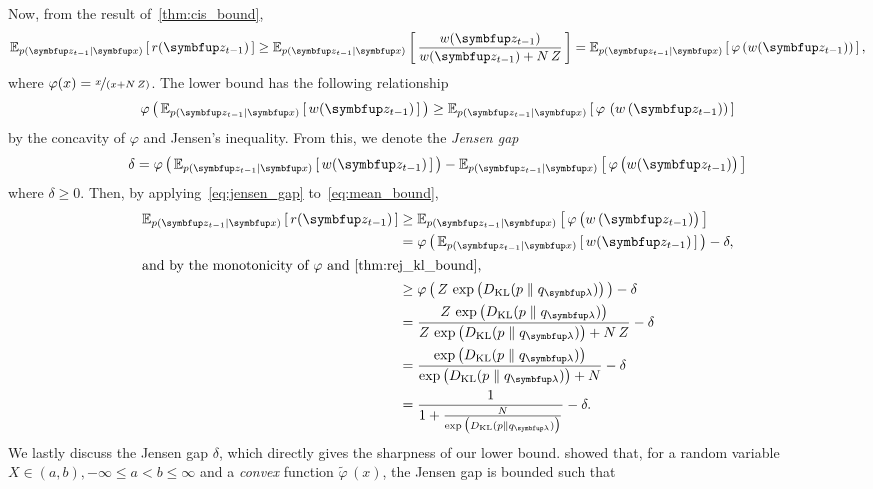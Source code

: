 \begin{proofEnd}
  Now, from the result of~\cref{thm:cis_bound},
  \begin{equation}
    \Esub{p(\vz_{t-1}\mid\vx)}{ r(\vz_{t-1}) } \geq \Esub{p(\vz_{t-1}\mid\vx)}{ \frac{w(\vz_{t-1})}{w(\vz_{t-1}) + N\,Z}} =
    \Esub{p(\vz_{t-1}\mid\vx)}{ \varphi\left( w(\vz_{t-1}) \right)  },\label{eq:mean_bound}
  \end{equation}
  where \(\varphi(x) = \nicefrac{x}{(x + N\,Z)}\).
  The lower bound has the following relationship
  \begin{equation}
    \varphi\left(\,
    \Esub{p(\vz_{t-1}\mid\vx)}{ w(\vz_{t-1}) }
    \,\right)
    \geq
    \Esub{p(\vz_{t-1}\mid\vx)}{ \varphi\,\left( w\,(\vz_{t-1}) \right)  }
  \end{equation}
  by the concavity of \(\varphi\) and Jensen's inequality.
  From this, we denote the \textit{Jensen gap}
  \begin{equation}
    \delta = 
    \varphi\left(\,
    \Esub{p(\vz_{t-1}\mid\vx)}{ w(\vz_{t-1}) }
    \,\right)
    -
    \Esub{p(\vz_{t-1}\mid\vx)}{ \varphi\,\big( w(\vz_{t-1}) \big)  }\label{eq:jensen_gap}
  \end{equation}
  where \(\delta \geq 0\).
  Then, by applying~\eqref{eq:jensen_gap} to~\eqref{eq:mean_bound},
  \begin{align}
    \Esub{p(\vz_{t-1}\mid\vx)}{ r(\vz_{t-1}) }
    &\geq \Esub{p(\vz_{t-1}\mid\vx)}{ \varphi\,\big( w\,(\vz_{t-1}) \big)  } \\
    &= \varphi\left(\,
    \Esub{p(\vz_{t-1}\mid\vx)}{ w(\vz_{t-1}) }
    \,\right) - \delta, \\
\intertext{and by the monotonicity of \(\varphi\) and~\cref{thm:rej_kl_bound},}
    &\geq \varphi\left(\,
    Z\,\exp\big(\DKL{p}{q_{\vlambda}}\big)
    \,\right) - \delta \\
    &=
    \frac{
      Z\,\exp\big(\DKL{p}{q_{\vlambda}}\big)
    }{
      Z\,\exp\big(\DKL{p}{q_{\vlambda}}\big) + N\,Z
    } - \delta \\
    &= \frac{
      \exp\big(\DKL{p}{q_{\vlambda}}\big)
    }{
      \exp\big(\DKL{p}{q_{\vlambda}}\big) + N
    } - \delta  \\
    &= \frac{1}{
       1 + \frac{N}{
         \exp\big(\DKL{p}{q_{\vlambda}}\big) 
      }
    } - \delta.
  \end{align}
  We lastly discuss the Jensen gap \(\delta\), which directly gives the sharpness of our lower bound.
  \citet[Theorem 1]{liao_sharpening_2019} showed that, for a random variable \(X \in (a, b), -\infty \leq a < b \leq \infty\) and a \textit{convex} function \(\widetilde{\varphi}\,(x)\), the Jensen gap is bounded such that

\end{proofEnd}
